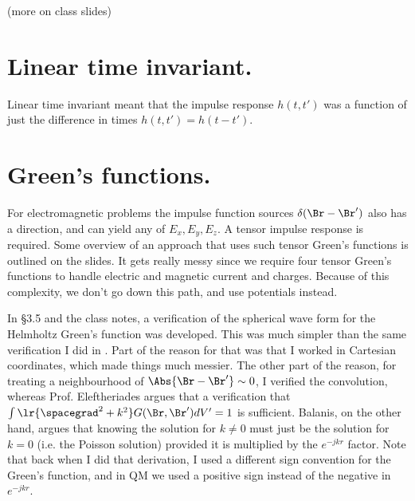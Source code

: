 (more on class slides)
%
\section{Linear time invariant.}
%
Linear time invariant meant that the impulse response \( h(t,t') \) was a function of just the difference in times \( h(t,t') = h(t-t') \).
%
\section{Green's functions.}
%
For electromagnetic problems the impulse function sources \( \delta(\Br - \Br') \) also has a direction, and can yield any of \( E_x, E_y, E_z \).  A tensor impulse response is required.
%
Some overview of an approach that uses such tensor Green's functions is outlined on the slides.  It gets really messy since we require four tensor Green's functions to handle electric and magnetic current and charges.  Because of this complexity, we don't go down this path, and use potentials instead.

In \S 3.5 \citep{balanis2005antenna} and the class notes, a verification of the spherical wave form for the Helmholtz Green's function was developed.  This was much simpler than the same verification I did in \citep{phy456:helmoltzGreens}.  Part of the reason for that was that I worked in Cartesian coordinates, which made things much messier.  The other part of the reason, for treating a neighbourhood of \( \Abs{\Br - \Br'} \sim 0 \), I verified the convolution, whereas Prof. Eleftheriades argues that a verification that \( \int \lr{\spacegrad^2 + k^2} G(\Br, \Br') dV' = 1\) is sufficient.  Balanis, on the other hand, argues that knowing the solution for \( k \ne 0 \) must just be the solution for \( k = 0 \) (i.e. the Poisson solution) provided it is multiplied by the \( e^{-j k r} \) factor.
%
Note that back when I did that derivation, I used a different sign convention for the Green's function, and in QM we used a positive sign instead of the negative in \( e^{-j k r } \).
%
%
%
%
